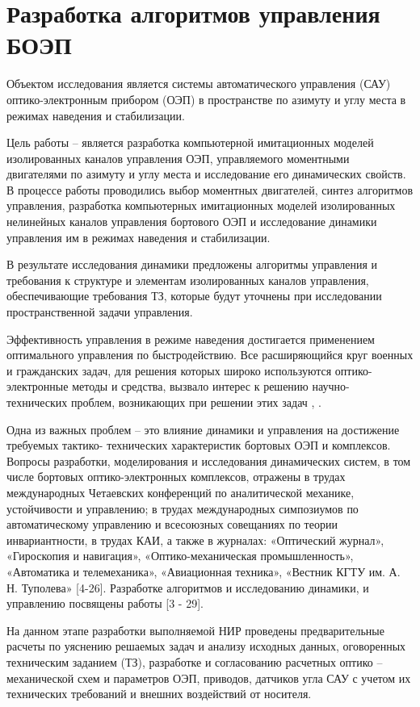 \chapter{Разработка алгоритмов управления БОЭП} \label{ch:ch4}

Объектом исследования является системы автоматического управления (САУ) оптико-электронным прибором (ОЭП) в пространстве по азимуту и углу места в режимах наведения и стабилизации.

Цель работы – является разработка компьютерной имитационных моделей изолированных каналов управления ОЭП, управляемого моментными двигателями по азимуту и углу места и исследование его динамических свойств.
В процессе работы проводились выбор моментных двигателей, синтез алгоритмов управления, разработка компьютерных имитационных моделей изолированных нелинейных каналов управления бортового ОЭП и исследование динамики управления им в режимах наведения и стабилизации.

В результате исследования динамики предложены алгоритмы управления и требования к структуре и элементам изолированных каналов управления, обеспечивающие требования ТЗ, которые будут уточнены при исследовании пространственной задачи управления.

Эффективность управления в режиме наведения достигается применением оптимального управления по быстродействию. 
Все расширяющийся круг военных и гражданских задач, для решения которых широко используются оптико-электронные методы и средства, вызвало интерес к решению научно- технических   проблем, возникающих при решении этих задач \cite[]{Tarasov}, \cite[]{Fedoseev}.

Одна из важных проблем – это влияние динамики и управления на достижение требуемых тактико- технических характеристик бортовых ОЭП и комплексов. Вопросы разработки, моделирования и исследования динамических систем, в том числе бортовых оптико-электронных комплексов, отражены в трудах международных Четаевских конференций по аналитической механике, устойчивости и управлению; в трудах международных симпозиумов по автоматическому управлению и всесоюзных совещаниях по теории инвариантности, в трудах КАИ, а также в журналах: «Оптический журнал», «Гироскопия и навигация», «Оптико-механическая промышленность», «Автоматика и телемеханика», «Авиационная техника», «Вестник КГТУ им. А. Н. Туполева» [4-26]. Разработке алгоритмов и исследованию динамики, и управлению посвящены работы [3 - 29].

На данном этапе разработки выполняемой НИР проведены предварительные расчеты по уяснению решаемых задач и анализу исходных данных, оговоренных техническим заданием (ТЗ), разработке и согласованию
расчетных оптико – механической схем и параметров ОЭП, приводов, датчиков угла САУ с учетом их технических требований и внешних воздействий от носителя.


